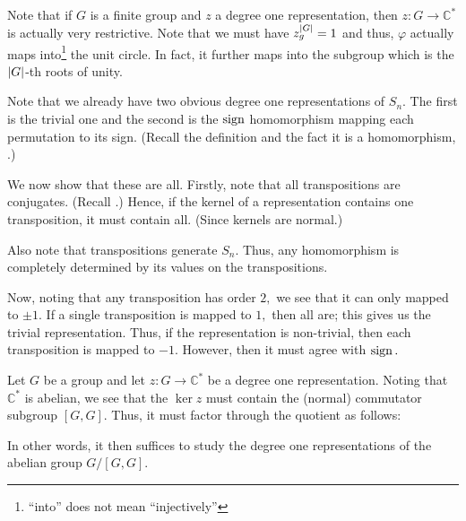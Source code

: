 \begin{rem} \label{rem:finrepintoS1}
	Note that if $G$ is a finite group and $z$ a degree one representation, then $z:G\to\mathbb{C}^*$ is actually very restrictive. Note that we must have $z_g^{{\left\lvert G \right\lvert}} = 1$ and thus, $\varphi$ actually maps into\footnote{``into'' does not mean ``injectively''} the unit circle. In fact, it further maps into the subgroup which is the ${\left\lvert G \right\lvert}$-th roots of unity.
\end{rem}

\begin{ex} \label{ex:degonerepsSn}
	Note that we already have two obvious degree one representations of $S_n.$ The first is the trivial one and the second is the $\operatorname{sign}$ homomorphism mapping each permutation to its sign. (Recall the definition  and the fact it is a homomorphism, .)

	We now show that these are all. Firstly, note that all transpositions are conjugates. (Recall .) Hence, if the kernel of a representation contains one transposition, it must contain all. (Since kernels are normal.) 

	Also note that transpositions generate $S_n.$ Thus, any homomorphism is completely determined by its values on the transpositions. 

	Now, noting that any transposition has order $2,$ we see that it can only mapped to $\pm 1.$ If a single transposition is mapped to $1,$ then all are; this gives us the trivial representation. Thus, if the representation is non-trivial, then each transposition is mapped to $-1.$ However, then it must agree with $\operatorname{sign}.$ 
\end{ex}

\begin{ex} \label{ex:deg1factorthrough}
	Let $G$ be a group and let $z : G \to \mathbb{C}^*$ be a degree one representation. Noting that $\mathbb{C}^*$ is abelian, we see that the $\ker z$ must contain the (normal) commutator subgroup $[G, G].$ Thus, it must factor through the quotient as follows:

	\begin{center}
	\end{center}

	In other words, it then suffices to study the degree one representations of the abelian group $G/[G, G].$
\end{ex}

